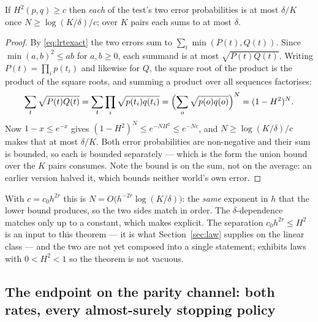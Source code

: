 \begin{theorem}
\label{thm:lrt}
If $H^{2}(p,q)\ge c$ then \emph{each} of the test's two error probabilities is at most
$\delta/K$ once $N\ge\log(K/\delta)/c$; over $K$ pairs each sums to at most $\delta$.
\end{theorem}

\begin{proof}
By \eqref{eq:lrtexact} the two errors sum to $\sum_{t}\min(P(t),Q(t))$. Since
$\min(a,b)^{2}\le ab$ for $a,b\ge0$, each summand is at most $\sqrt{P(t)Q(t)}$. Writing
$P(t)=\prod_{i}p(t_{i})$ and likewise for $Q$, the square root of the product is the
product of the square roots, and summing a product over all sequences factorises:
\[
\sum_{t}\sqrt{P(t)Q(t)}
=\sum_{t}\prod_{i}\sqrt{p(t_{i})q(t_{i})}
=\Bigl(\sum_{o}\sqrt{p(o)q(o)}\Bigr)^{N}
=(1-H^{2})^{N}.
\]
Now $1-x\le e^{-x}$ gives $(1-H^{2})^{N}\le e^{-NH^{2}}\le e^{-Nc}$, and
$N\ge\log(K/\delta)/c$ makes that at most $\delta/K$. Both error probabilities are
non-negative and their sum is bounded, so each is bounded separately --- which is the form
the union bound over the $K$ pairs consumes. Note the bound is on the sum, not on the
average: an earlier version halved it, which bounds neither world's own error.
\end{proof}

With $c=c_{0}h^{2r}$ this is $N=O\bigl(h^{-2r}\log(K/\delta)\bigr)$: the \emph{same}
exponent in $h$ that the lower bound produces, so the two sides match in order. The
$\delta$-dependence matches only up to a constant, which  makes
explicit. The separation $c_{0}h^{2r}\le H^{2}$ is an input to this theorem --- it is what
Section~\ref{sec:law} supplies on the linear class --- and the two are not yet composed
into a single statement;  exhibits laws with $0<H^{2}<1$ so
the theorem is not vacuous.


\subsection{The endpoint on the parity channel: both rates, every almost-surely stopping policy}
\label{sec:endpoint}

